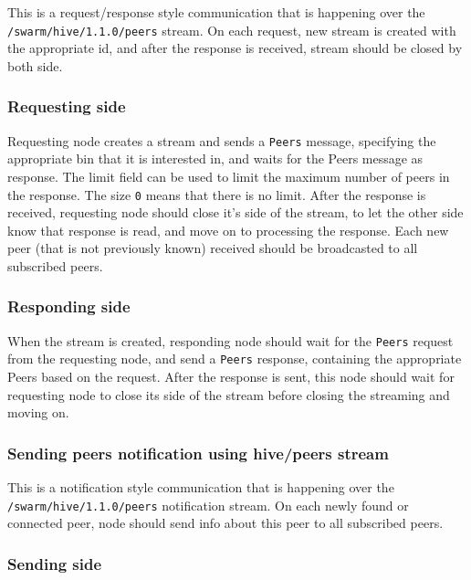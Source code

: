 This is a request/response style communication that is happening over the \texttt{/swarm/hive/1.1.0/peers} stream.
On each request, new stream is created with the appropriate id, and after the response is received, stream should be closed by both side.

\subsubsection{Requesting side}\label{requesting-side}

Requesting node creates a stream and sends a \texttt{Peers} message,
specifying the appropriate bin that it is interested in, and waits for
the Peers message as response. The limit field can be used to limit the
maximum number of peers in the response. The size \texttt{0} means that
there is no limit. After the response is received, requesting node
should close it's side of the stream, to let the other side know that
response is read, and move on to processing the response. Each new peer
(that is not previously known) received should be broadcasted to all
subscribed peers.

\subsubsection{Responding side}\label{responding-side}

When the stream is created, responding node should wait for the
\texttt{Peers} request from the requesting node, and send a
\texttt{Peers} response, containing the appropriate Peers based on the
request. After the response is sent, this node should wait for
requesting node to close its side of the stream before closing the
streaming and moving on.

\subsubsection{Sending peers notification using hive/peers stream}\label{sending-peers-notification-using-hivepeers-stream}

This is a notification style communication that is happening over the
\texttt{/swarm/hive/1.1.0/peers} notification stream. On each newly
found or connected peer, node should send info about this peer to all
subscribed peers.

\subsubsection{Sending side}\label{sending-side}

